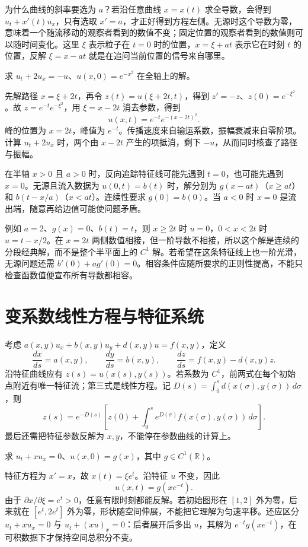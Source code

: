 \documentclass[UTF8,12pt,a4paper,fontset=fandol]{ctexbook}
\begin{document}
为什么曲线的斜率要选为 $a$？若沿任意曲线 $x=x(t)$ 求全导数，会得到 $u_t+x'(t)u_x$，只有选取 $x'=a$，才正好得到方程左侧。无源时这个导数为零，意味着一个随流移动的观察者看到的数值不变；固定位置的观察者看到的数值则可以随时间变化。这里 $\xi$ 表示粒子在 $t=0$ 时的位置，$x=\xi+at$ 表示它在时刻 $t$ 的位置，反解 $\xi=x-at$ 就是在追问当前位置的信号来自哪里。

\begin{example}[带衰减的平移]
求 $u_t+2u_x=-u$、$u(x,0)=e^{-x^2}$ 在全轴上的解。
\end{example}
\begin{solve}
先解路径 $x=\xi+2t$，再令 $z(t)=u(\xi+2t,t)$，得到 $z'=-z$、$z(0)=e^{-\xi^2}$。故 $z=e^{-t}e^{-\xi^2}$，用 $\xi=x-2t$ 消去参数，得到
\[
 u(x,t)=e^{-t}e^{-(x-2t)^2}.
\]
峰的位置为 $x=2t$，峰值为 $e^{-t}$。传播速度来自输运系数，振幅衰减来自零阶项。计算 $u_t+2u_x$ 时，两个由 $x-2t$ 产生的项抵消，剩下 $-u$，从而同时核查了路径与振幅。
\end{solve}

在半轴 $x>0$ 且 $a>0$ 时，反向追踪特征线可能先遇到 $t=0$，也可能先遇到 $x=0$。无源且流入数据为 $u(0,t)=b(t)$ 时，解分别为 $g(x-at)$（$x\ge at$）和 $b(t-x/a)$（$x<at$）。连续性要求 $g(0)=b(0)$。当 $a<0$ 时 $x=0$ 是流出端，随意再给边值可能使问题矛盾。

例如 $a=2$、$g(x)=0$、$b(t)=t$，则 $x\ge2t$ 时 $u=0$，$0<x<2t$ 时 $u=t-x/2$。在 $x=2t$ 两侧数值相接，但一阶导数不相接，所以这个解是连续的分段经典解，而不是整个半平面上的 $C^1$ 解。若希望在这条特征线上也一阶光滑，无源问题还需 $b'(0)+ag'(0)=0$。相容条件应随所要求的正则性提高，不能只检查函数值便宣布所有导数都相容。

\section{变系数线性方程与特征系统}
考虑 $a(x,y)u_x+b(x,y)u_y+d(x,y)u=f(x,y)$，定义
\[
 \frac{dx}{ds}=a(x,y),\qquad \frac{dy}{ds}=b(x,y),\qquad
 \frac{dz}{ds}=f(x,y)-d(x,y)z.
\]
沿特征曲线应有 $z(s)=u(x(s),y(s))$。若系数为 $C^1$，前两式在每个初始点附近有唯一特征流；第三式是线性方程。记 $D(s)=\int_0^s d(x(\sigma),y(\sigma))\,d\sigma$，则
\[
 z(s)=e^{-D(s)}\left[z(0)+\int_0^s e^{D(\sigma)}f(x(\sigma),y(\sigma))\,d\sigma\right].
\]
最后还需把特征参数反解为 $x,y$，不能停在参数曲线的计算上。

\begin{example}[变化的输运速度]
求 $u_t+xu_x=0$、$u(x,0)=g(x)$，其中 $g\in C^1(\mathbb R)$。
\end{example}
\begin{solve}
特征方程为 $x'=x$，故 $x(t)=\xi e^t$。沿特征 $u$ 不变，因此
\[
 u(x,t)=g(xe^{-t}).
\]
由于 $\partial x/\partial\xi=e^t>0$，任意有限时刻都能反解。若初始图形在 $[1,2]$ 外为零，后来就在 $[e^t,2e^t]$ 外为零，形状随空间伸展，不能把它理解为匀速平移。还应区分 $u_t+xu_x=0$ 与 $u_t+(xu)_x=0$：后者展开后多出 $u$，其解为 $e^{-t}g(xe^{-t})$，在可积数据下才保持空间总积分不变。
\end{solve}
\end{document}

